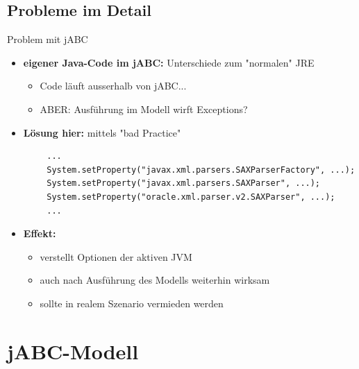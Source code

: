 \subsection*{Probleme im Detail}
\begin{frame}{Problem mit jABC}
\begin{itemize}[<+->]
	\item \textbf{eigener Java-Code im jABC:} Unterschiede zum "normalen" JRE 
	\begin{itemize}[<+->]
			\item Code läuft ausserhalb von jABC...
			\item ABER: Ausführung im Modell wirft Exceptions?
	\end{itemize}
	\pause	
	\item \textbf{Lösung hier:} mittels "bad Practice"
\end{itemize}		
	\begin{lstlisting}
		...
		System.setProperty("javax.xml.parsers.SAXParserFactory", ...);
        System.setProperty("javax.xml.parsers.SAXParser", ...);
        System.setProperty("oracle.xml.parser.v2.SAXParser", ...);
        ...
	\end{lstlisting}
\begin{itemize}[<+->]	
	\item \textbf{Effekt:} 
		\begin{itemize}[<+->]
			\item verstellt Optionen der aktiven JVM
			\item auch nach Ausführung des Modells weiterhin wirksam
			\item sollte in realem Szenario vermieden werden
		\end{itemize}
\end{itemize}
\end{frame}


\section{jABC-Modell}

